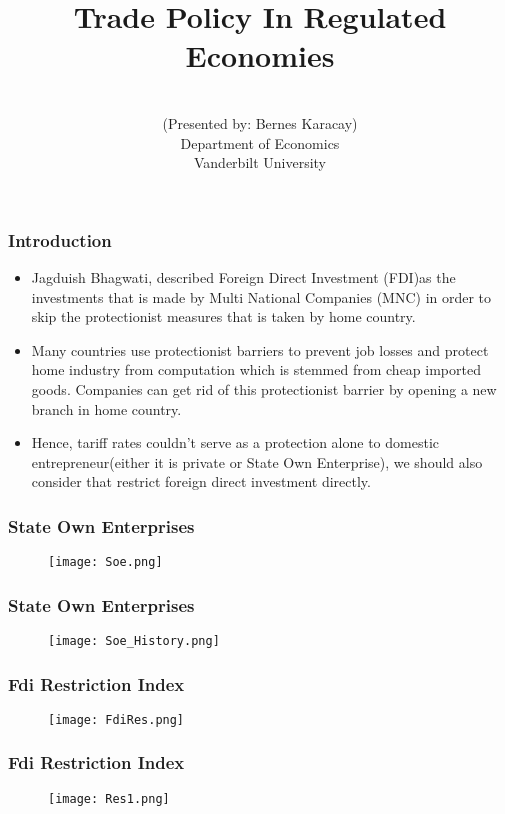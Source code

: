 \documentclass[xcolor=dvipsnames]{beamer}
\title [Vanderbilt University] {Trade Policy In Regulated Economies}
\author[Bernes Karacay]{\textbf{}\\
\vskip 0.1in (Presented by: Bernes Karacay)\\
\vskip 0.2in
Department of  Economics\\
  Vanderbilt University}
\institute[]{}
\date{}
\begin{document}
\begin{frame}
\titlepage
\end{frame}

\begin{frame}
\frametitle{Introduction}
\begin{itemize}
  \item Jagduish Bhagwati, described Foreign Direct Investment (FDI)as the investments that is made
  by Multi National Companies (MNC) in order to skip the protectionist measures that is taken by
  home country.
 \item Many countries use protectionist barriers to prevent job losses and protect home
 industry from computation which is stemmed from cheap imported goods. Companies can get
 rid of this protectionist barrier by opening a new branch in home country.
 \item Hence, tariff rates
 couldn't serve as a protection alone to domestic entrepreneur(either it is private or State Own
 Enterprise), we should also consider that restrict foreign direct investment directly.
\end{itemize}
\end{frame}

\begin{frame}
	\frametitle{State Own Enterprises}
	\begin{figure}
		\begin{center}
			\texttt{[image: Soe.png]}
		\end{center}
	\end{figure}
\end{frame}

\begin{frame}
	\frametitle{State Own Enterprises}
	\begin{figure}
		\begin{center}
			\texttt{[image: Soe\_History.png]}
		\end{center}
	\end{figure}
\end{frame}

\begin{frame}
	\frametitle{Fdi Restriction Index}
	\begin{figure}
		\begin{center}
			\texttt{[image: FdiRes.png]}
		\end{center}
	\end{figure}
\end{frame}

\begin{frame}
	\frametitle{ Fdi Restriction Index}
	\begin{figure}
		\begin{center}
			\texttt{[image: Res1.png]}
		\end{center}
	\end{figure}
\end{frame}
\end{document}
